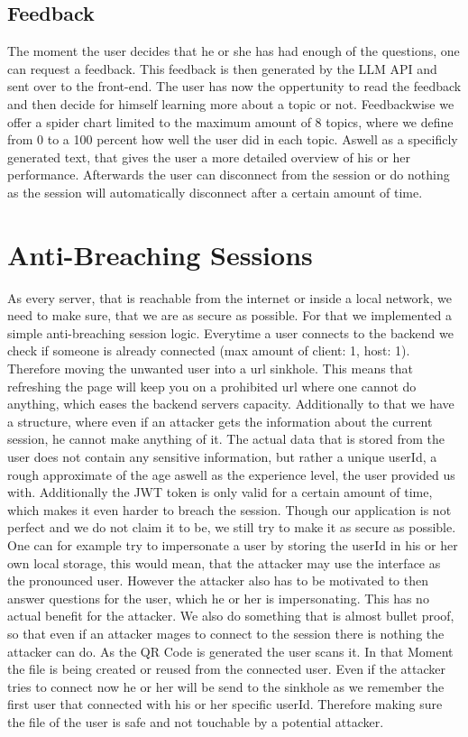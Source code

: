 \subsection{Feedback}
The moment the user decides that he or she has had enough of the questions, one can request a feedback.
This feedback is then generated by the LLM API and sent over to the front-end.
The user has now the oppertunity to read the feedback and then decide for himself learning more about a topic or not.
Feedbackwise we offer a spider chart limited to the maximum amount of 8 topics, where we define from 0 to a 100 percent how well the user did in each topic.
Aswell as a specificly generated text, that gives the user a more detailed overview of his or her performance.
Afterwards the user can disconnect from the session or do nothing as the session will automatically disconnect after a certain amount of time.

\section{Anti-Breaching Sessions}
As every server, that is reachable from the internet or inside a local network, we need to make sure, that we are as secure as possible.
For that we implemented a simple anti-breaching session logic.
Everytime a user connects to the backend we check if someone is already connected (max amount of client: 1, host: 1).
Therefore moving the unwanted user into a url sinkhole.
This means that refreshing the page will keep you on a prohibited url where one cannot do anything, which eases the backend servers capacity.
Additionally to that we have a structure, where even if an attacker gets the information about the current session, he cannot make anything of it.
The actual data that is stored from the user does not contain any sensitive information, 
but rather a unique userId, a rough approximate of the age aswell as the experience level, the user provided us with.
Additionally the JWT token is only valid for a certain amount of time, which makes it even harder to breach the session.
Though our application is not perfect and we do not claim it to be, we still try to make it as secure as possible.
One can for example try to impersonate a user by storing the userId in his or her own local storage, this would mean, that the attacker may use the interface as
the pronounced user.
However the attacker also has to be motivated to then answer questions for the user, which he or her is impersonating.
This has no actual benefit for the attacker.
We also do something that is almost bullet proof, so that even if an attacker mages to connect to the session there is nothing the attacker can do.
As the QR Code is generated the user scans it.
In that Moment the file is being created or reused from the connected user.
Even if the attacker tries to connect now he or her will be send to the sinkhole as we remember the first user that connected with his or her specific userId.
Therefore making sure the file of the user is safe and not touchable by a potential attacker.

